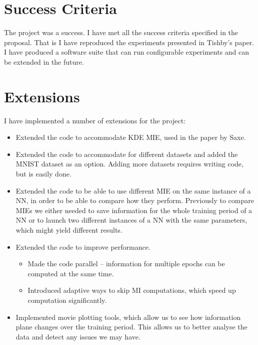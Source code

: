 \documentclass[dissertation.tex]{subfiles}
\begin{document}
\section{Success Criteria}

The project was a success. I have met all the success criteria specified in the
proposal. That is I have reproduced the experiments presented in Tishby's paper.
I have produced a software suite that can run configurable experiments and can
be extended in the future.

\section{Extensions}

I have implemented a number of extensions for the project:

\begin{itemize}
  \item{
      Extended the code to accommodate KDE MIE, used in the paper by Saxe.
    }
  \item{
      Extended the code to accommodate for different datasets and added the
      MNIST dataset as an option. Adding more datasets requires writing code,
      but is easily done.
    }
  \item{
      Extended the code to be able to use different MIE on the same instance of
      a NN, in order to be able to compare how they perform. Previously to
      compare MIEs we either needed to save information for the whole training
      period of a NN or to launch two different instances of a NN with the same
      parameters, which might yield different results.
    }
  \item{
      Extended the code to improve performance.
      \begin{itemize}
        \item{
            Made the code parallel -- information for multiple epochs can be
            computed at the same time.
          }
        \item{
            Introduced adaptive ways to skip MI computations, which speed up
            computation significantly.
          }
      \end{itemize}
    }
  \item{
      Implemented movie plotting tools, which allow us to see how information
      plane changes over the training period. This allows us to better analyse
      the data and detect any issues we may have.
    }
\end{itemize}
\end{document}
